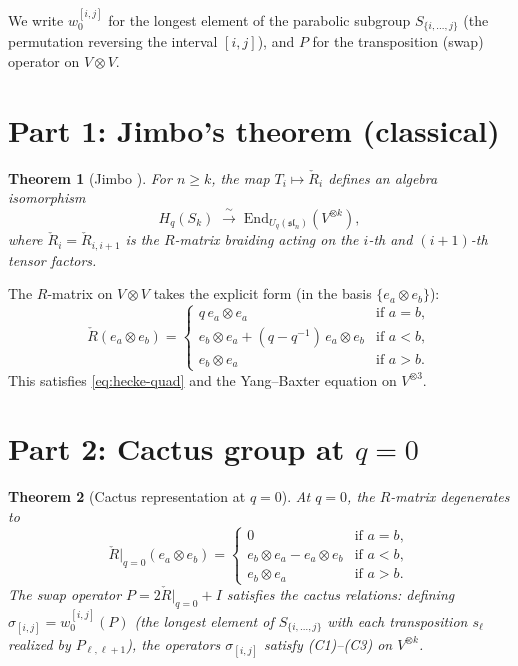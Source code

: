 \documentclass[11pt]{article}
\newtheorem{theorem}{Theorem}
\theoremstyle{remark}
\newcommand{\End}{\mathrm{End}}
\begin{document}
We write $w_0^{[i,j]}$ for the longest element of the parabolic subgroup $S_{\{i,\ldots,j\}}$
(the permutation reversing the interval $[i,j]$), and $P$ for the transposition (swap) operator
on $V \otimes V$.

\section{Part 1: Jimbo's theorem (classical)}
\label{sec:part1}

\begin{theorem}[Jimbo \cite{jimbo1986}]
\label{thm:jimbo}
For $n \ge k$, the map $T_i \mapsto \check{R}_i$ defines an algebra isomorphism
\[
  H_q(S_k) \;\xrightarrow{\;\sim\;}\; \End_{U_q(\mathfrak{sl}_n)}(V^{\otimes k}),
\]
where $\check{R}_i = \check{R}_{i,i+1}$ is the $R$-matrix braiding acting on
the $i$-th and $(i+1)$-th tensor factors.
\end{theorem}

The $R$-matrix on $V \otimes V$ takes the explicit form (in the basis
$\{e_a \otimes e_b\}$):
\begin{equation}\label{eq:R-matrix}
  \check{R}(e_a \otimes e_b) = \begin{cases}
    q\, e_a \otimes e_a & \text{if } a = b,\\
    e_b \otimes e_a + (q - q^{-1})\, e_a \otimes e_b & \text{if } a < b,\\
    e_b \otimes e_a & \text{if } a > b.
  \end{cases}
\end{equation}
This satisfies \eqref{eq:hecke-quad} and the Yang--Baxter equation on $V^{\otimes 3}$.

\section{Part 2: Cactus group at \texorpdfstring{$q=0$}{q=0}}
\label{sec:part2}

\begin{theorem}[Cactus representation at $q=0$]
\label{thm:cactus-q0}
At $q = 0$, the $R$-matrix degenerates to
\begin{equation}\label{eq:R-at-0}
  \check{R}\big|_{q=0}(e_a \otimes e_b) = \begin{cases}
    0 & \text{if } a = b,\\
    e_b \otimes e_a - e_a \otimes e_b & \text{if } a < b,\\
    e_b \otimes e_a & \text{if } a > b.
  \end{cases}
\end{equation}
The swap operator $P = 2\check{R}\big|_{q=0} + I$ satisfies the cactus relations:
defining $\sigma_{[i,j]} = w_0^{[i,j]}(P)$ (the longest element of $S_{\{i,\ldots,j\}}$
with each transposition $s_\ell$ realized by $P_{\ell,\ell+1}$),
the operators $\sigma_{[i,j]}$ satisfy \emph{(C1)--(C3)} on $V^{\otimes k}$.
\end{theorem}
\end{document}
